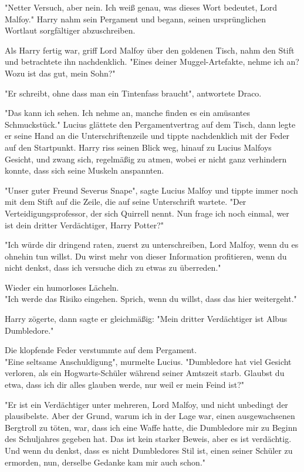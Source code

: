 {"Netter Versuch, aber nein. Ich weiß genau, was dieses Wort bedeutet, Lord Malfoy." Harry nahm sein Pergament und begann, seinen ursprünglichen Wortlaut sorgfältiger abzuschreiben.

Als Harry fertig war, griff Lord Malfoy über den goldenen Tisch, nahm den Stift und betrachtete ihn nachdenklich. "Eines deiner Muggel-Artefakte, nehme ich an? Wozu ist das gut, mein Sohn?"

"Er schreibt, ohne dass man ein Tintenfass braucht", antwortete Draco.

"Das kann ich sehen. Ich nehme an, manche finden es ein amüsantes Schmuckstück." Lucius glättete den Pergamentvertrag auf dem Tisch, dann legte er seine Hand an die Unterschriftenzeile und tippte nachdenklich mit der Feder auf den Startpunkt. Harry riss seinen Blick weg, hinauf zu Lucius Malfoys Gesicht, und zwang sich, regelmäßig zu atmen, wobei er nicht ganz verhindern konnte, dass sich seine Muskeln anspannten.

"Unser guter Freund Severus Snape", sagte Lucius Malfoy und tippte immer noch mit dem Stift auf die Zeile, die auf seine Unterschrift wartete. "Der Verteidigungsprofessor, der sich Quirrell nennt. Nun frage ich noch einmal, wer ist dein dritter Verdächtiger, Harry Potter?"

"Ich würde dir dringend raten, zuerst zu unterschreiben, Lord Malfoy, wenn du es ohnehin tun willst. Du wirst mehr von dieser Information profitieren, wenn du nicht denkst, dass ich versuche dich zu etwas zu überreden."

Wieder ein humorloses Lächeln.\\ "Ich werde das Risiko eingehen. Sprich, wenn du willst, dass das hier weitergeht."

Harry zögerte, dann sagte er gleichmäßig: "Mein dritter Verdächtiger ist Albus Dumbledore."

Die klopfende Feder verstummte auf dem Pergament.\\ "Eine seltsame Anschuldigung", murmelte Lucius. "Dumbledore hat viel Gesicht verloren, als ein Hogwarts-Schüler während seiner Amtszeit starb. Glaubst du etwa, dass ich dir alles glauben werde, nur weil er mein Feind ist?"

"Er ist ein Verdächtiger unter mehreren, Lord Malfoy, und nicht unbedingt der plausibelste. Aber der Grund, warum ich in der Lage war, einen ausgewachsenen Bergtroll zu töten, war, dass ich eine Waffe hatte, die Dumbledore mir zu Beginn des Schuljahres gegeben hat. Das ist kein starker Beweis, aber es ist verdächtig. Und wenn du denkst, dass es nicht Dumbledores Stil ist, einen seiner Schüler zu ermorden, nun, derselbe Gedanke kam mir auch schon."

}
